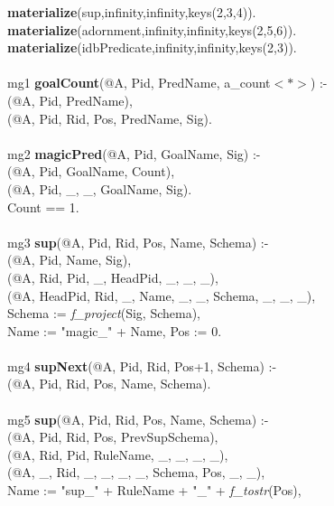 \begin{figure}
\ssp
\begin{boxedminipage}{\linewidth}
{\bf materialize}(sup,infinity,infinity,keys(2,3,4)). \\
{\bf materialize}(adornment,infinity,infinity,keys(2,5,6)). \\
{\bf materialize}(idbPredicate,infinity,infinity,keys(2,3)). \\
\\
mg1 {\bf goalCount}(@A, Pid, PredName, a\_count$<*>$) :- \\
(@A, Pid, PredName), \\
(@A, Pid, Rid, Pos, PredName, Sig). \\
\\
mg2 {\bf magicPred}(@A, Pid, GoalName, Sig) :- \\
(@A, Pid, GoalName, Count), \\
(@A, Pid, \_, \_, GoalName, Sig). \\
\datalogspace Count == 1. \\
\\
mg3 {\bf sup}(@A, Pid, Rid, Pos, Name, Schema) :- \\
(@A, Pid, Name, Sig), \\
(@A, Rid, Pid, \_, HeadPid, \_, \_, \_), \\
(@A, HeadPid, Rid, \_, Name, \_, \_, Schema, \_, \_, \_), \\
\datalogspace Schema := {\em f\_project}(Sig, Schema), \\
\datalogspace Name := "magic\_" + Name, Pos := 0. \\
\\
mg4 {\bf supNext}(@A, Pid, Rid, Pos+1, Schema) :- \\
(@A, Pid, Rid, Pos, Name, Schema). \\
\\
mg5 {\bf sup}(@A, Pid, Rid, Pos, Name, Schema) :- \\
(@A, Pid, Rid, Pos, PrevSupSchema),\\
(@A, Rid, Pid, RuleName, \_, \_, \_, \_),\\
(@A, \_, Rid, \_, \_, \_, \_, Schema, Pos, \_, \_),\\
\datalogspace Name := "sup\_" + RuleName + "\_" + {\em f\_tostr}(Pos),\\

\end{boxedminipage}
\end{figure}
